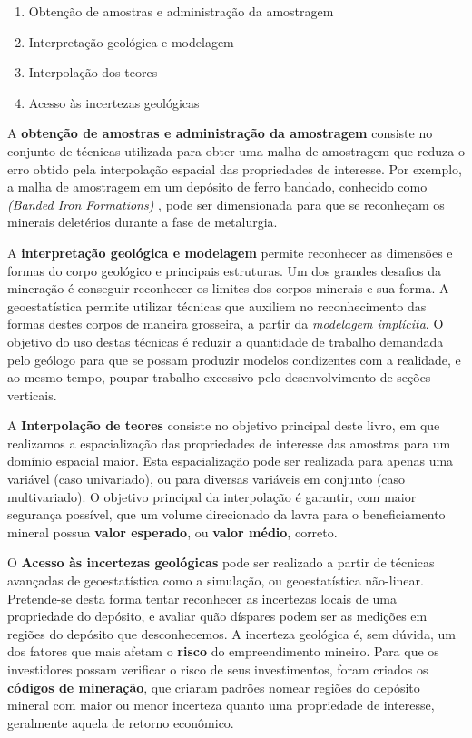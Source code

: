  \begin{enumerate}
 	\item Obtenção de amostras e administração da amostragem
 	\item Interpretação geológica e modelagem 
 	\item Interpolação dos teores
 	\item Acesso às incertezas geológicas
 \end{enumerate}

A \textbf{obtenção de amostras e administração da amostragem} consiste no conjunto de técnicas utilizada para obter uma malha de amostragem que reduza o erro obtido pela interpolação espacial das propriedades de interesse. Por exemplo, a malha de amostragem em um depósito de ferro bandado, conhecido como \textit{(Banded Iron Formations)} , pode ser dimensionada para que se reconheçam os minerais deletérios durante a fase de metalurgia. 

A \textbf{interpretação geológica e modelagem} permite reconhecer as dimensões e formas do corpo geológico e principais estruturas. Um dos grandes desafios da mineração é conseguir reconhecer os limites dos corpos minerais e sua forma. A geoestatística permite utilizar técnicas que auxiliem no reconhecimento das formas destes corpos de maneira grosseira, a partir da \textit{modelagem implícita}. O objetivo do uso destas técnicas é reduzir a quantidade de trabalho demandada pelo geólogo para que se possam produzir modelos condizentes com a realidade, e ao mesmo tempo, poupar trabalho excessivo pelo desenvolvimento de seções verticais. 

A \textbf{Interpolação de teores} consiste no objetivo principal deste livro, em que realizamos a espacialização das propriedades de interesse das amostras para um domínio espacial maior. Esta espacialização pode ser realizada para apenas uma variável (caso univariado), ou para diversas variáveis em conjunto (caso multivariado). O objetivo principal da interpolação é garantir, com maior segurança possível, que um volume direcionado da lavra para o beneficiamento mineral possua \textbf{valor esperado}, ou \textbf{valor médio}, correto. 

O \textbf{Acesso às incertezas geológicas}  pode ser realizado a partir de técnicas avançadas de geoestatística como a simulação, ou geoestatística não-linear. Pretende-se desta forma tentar reconhecer as incertezas locais de uma propriedade do depósito, e avaliar quão díspares podem ser as medições em regiões do depósito que desconhecemos. A incerteza geológica é, sem dúvida, um dos fatores que mais afetam o \textbf{risco} do empreendimento mineiro. Para que os investidores possam verificar o risco de seus investimentos, foram criados os \textbf{códigos de mineração}, que criaram padrões nomear regiões do depósito mineral com maior ou menor incerteza quanto uma propriedade de interesse, geralmente aquela de retorno econômico. 
 

